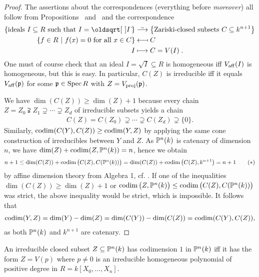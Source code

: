 \documentclass[a4paper,parskip=half,numbers=enddot, DIV=12, headheight=30pt]{scrreprt}
\begin{document}
\begin{proof}
The assertions about the correspondences (everything before \emph{moreover}) all follow from Propositions~
and~ and the correspondence
\begin{align*}
\left\{\text{ideals }I\subseteq R\text{ such that }I=\sqrt I\right\}&\isomorphism\left\{\text{Zariski-closed subsets }C\subseteq k^{n+1}\right\}\\
\left\{f\in R\st f(x)=0\text{ for all }x\in C\right\} &\longmapsfrom C\\
I&\longmapsto C=V(I)\;.
\end{align*}
One must of course check that an ideal $I=\sqrt I\subseteq R$ is homogeneous iff $V_{\mathrm{aff}}(I)$ is homogeneous, but this is easy. In particular, $C(Z)$ is irreducible iff it equals $V_{\mathrm{aff}}(\mathfrak{p})$ for some $\mathfrak{p} \in \operatorname{Spec} R$ with $Z=V_{\mathrm{proj}}(\mathfrak{p})$.

We have $\dim(C(Z))\geq \dim(Z)+1$ because every chain $Z = Z_0 \supsetneqq Z_1\supsetneq \cdots\supsetneq Z_d$
of irreducible subsets yields a chain
\begin{align*}
C(Z) = C(Z_0) \supsetneq \cdots\supsetneq C(Z_d)\supsetneq \{0\}.
\end{align*}
Similarly, $\operatorname{codim}(C(Y),C(Z)) \geq \operatorname{codim}(Y,Z)$ by applying the same cone construction of irreducibles between $Y$ and $Z$.
As $\mathbb{P}^n(k)$ is catenary of dimension $n$, we have $\dim(Z) + \operatorname{codim}(Z,\mathbb{P}^n(k)) = n$, hence we obtain
\begin{align}\lbl{eq:proofAffineConeCorrespondenceAst}
n+1\leq \dim(C(Z)) + \codim\big(C(Z),C(\IP^n(k))\big) = \dim(C(Z)) + \codim\big(C(Z),k^{n+1}\big)
= n+1\tag{$\ast$}
\end{align}
by affine dimension theory from Algebra 1, cf. \cite[Theorem~5]{alg1}.
If one of the inequalities $\dim(C(Z))\geq \dim(Z)+1$ or $\operatorname{codim}\big(Z,\mathbb{P}^n(k)\big) \leq \operatorname{codim}\big(C(Z), C(\mathbb{P}^n(k))\big)$ was strict,
the above inequality  would be strict, which is impossible. It follows that
\begin{align*}
\operatorname{codim}(Y,Z) = \dim(Y)-\dim(Z) = \dim(C(Y)) - \dim(C(Z)) = \operatorname{codim}(C(Y),C(Z)),
\end{align*}
as both $\mathbb{P}^n(k)$ and $k^{n+1}$ are catenary.
\end{proof}
\begin{cor}
An irreducible closed
subset $Z\subseteq\mathbb{P}^n(k)$ has codimension $1$ in $\mathbb{P}^n(k)$ iff it has the form $Z = V(p)$ where $p\neq 0$ is an irreducible homogeneous polynomial of positive degree in $R=k[X_0,\ldots,X_n]$.
\end{cor}
\end{document}

